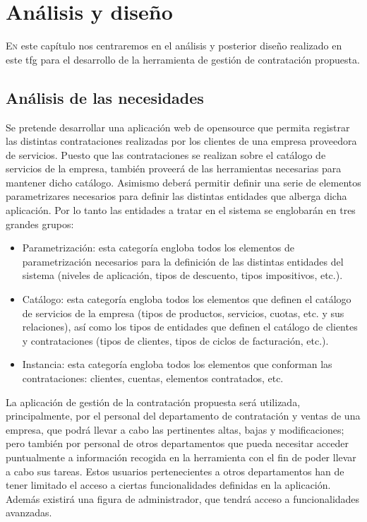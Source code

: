 \chapter{Análisis y diseño}
\label{chap:analisis-diseño}


\lettrine{E}{n} este capítulo nos centraremos en el análisis y posterior diseño realizado en este \acrshort{tfg} para el desarrollo de la herramienta de gestión de contratación propuesta.

\section{Análisis de las necesidades}
\label{sec:analisis}
Se pretende desarrollar una aplicación web de \gls{opensource} que permita registrar las distintas contrataciones realizadas por los clientes de una empresa proveedora de servicios. Puesto que las contrataciones se realizan sobre el catálogo de servicios de la empresa, también proveerá de las herramientas necesarias para mantener dicho catálogo. Asimismo deberá permitir definir una serie de elementos parametrizares necesarios para definir las distintas entidades que alberga dicha aplicación. Por lo tanto las entidades a tratar en el sistema se englobarán en tres grandes grupos:
\begin{itemize}
\item Parametrización: esta categoría engloba todos los elementos de parametrización necesarios para la definición de las distintas entidades del sistema (niveles de aplicación, tipos de descuento, tipos impositivos, etc.).
\item Catálogo: esta categoría engloba todos los elementos que definen el catálogo de servicios de la empresa (tipos de productos, servicios, cuotas, etc. y sus relaciones), así como los tipos de entidades que definen el catálogo de clientes y contrataciones (tipos de clientes, tipos de ciclos de facturación, etc.).
\item Instancia: esta categoría engloba todos los elementos que conforman las contrataciones: clientes, cuentas, elementos contratados, etc.
\end{itemize}


La aplicación de gestión de la contratación propuesta será utilizada, principalmente, por el personal del departamento de contratación y ventas de una empresa, que podrá llevar a cabo las pertinentes altas, bajas y modificaciones; pero también por personal de otros departamentos que pueda necesitar acceder puntualmente a información recogida en la herramienta con el fin de poder llevar a cabo sus tareas. Estos usuarios pertenecientes a otros departamentos han de tener limitado el acceso a ciertas funcionalidades definidas en la aplicación. Además existirá una figura de administrador, que tendrá acceso a funcionalidades avanzadas.


